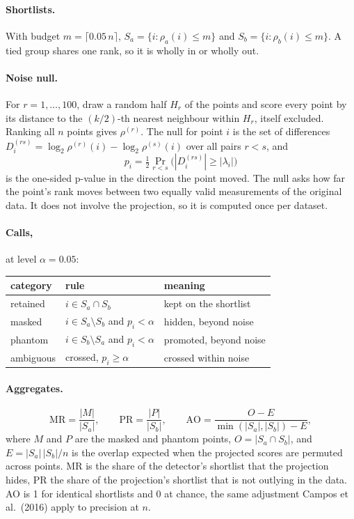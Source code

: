 \paragraph{Shortlists.} With budget $m = \lceil 0.05\, n \rceil$,
$S_a = \{ i : \rho_a(i) \le m \}$ and $S_b = \{ i : \rho_b(i) \le m \}$. A
tied group shares one rank, so it is wholly in or wholly out.

\paragraph{Noise null.} For $r = 1, \dots, 100$, draw a random half $H_r$
of the points and score every point by its distance to the $(k/2)$-th
nearest neighbour within $H_r$, itself excluded. Ranking all $n$ points
gives $\rho^{(r)}$. The null for point $i$ is the set of differences
$D_i^{(rs)} = \log_2 \rho^{(r)}(i) - \log_2 \rho^{(s)}(i)$ over all pairs
$r < s$, and
\begin{equation*}
  p_i = \tfrac{1}{2} \Pr_{r<s}\bigl( |D_i^{(rs)}| \ge |\lambda_i| \bigr)
\end{equation*}
is the one-sided p-value in the direction the point moved. The null asks how
far the point's rank moves between two equally valid measurements of the
original data. It does not involve the projection, so it is computed once
per dataset.

\paragraph{Calls,} at level $\alpha = 0.05$:
\begin{center}
\begin{tabular}{lll}
\hline
category & rule & meaning \\
\hline
retained & $i \in S_a \cap S_b$ & kept on the shortlist \\
masked & $i \in S_a \setminus S_b$ and $p_i < \alpha$ & hidden, beyond noise \\
phantom & $i \in S_b \setminus S_a$ and $p_i < \alpha$ & promoted, beyond noise \\
ambiguous & crossed, $p_i \ge \alpha$ & crossed within noise \\
\hline
\end{tabular}
\end{center}

\paragraph{Aggregates.}
\begin{equation*}
  \mathrm{MR} = \frac{|M|}{|S_a|}, \qquad
  \mathrm{PR} = \frac{|P|}{|S_b|}, \qquad
  \mathrm{AO} = \frac{O - E}{\min(|S_a|, |S_b|) - E},
\end{equation*}
where $M$ and $P$ are the masked and phantom points, $O = |S_a \cap S_b|$,
and $E = |S_a|\,|S_b| / n$ is the overlap expected when the projected scores
are permuted across points. MR is the share of the detector's shortlist that
the projection hides, PR the share of the projection's shortlist that is not
outlying in the data. AO is 1 for identical shortlists and 0 at chance, the
same adjustment Campos et al.\ (2016) apply to precision at $n$.

